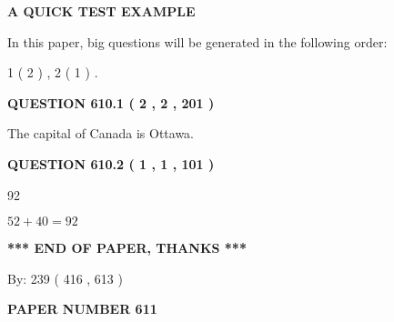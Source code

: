 \documentclass[12pt]{article}
\begin{document}
   
 \vspace{0.2in}
{\LARGE {\textbf{ A QUICK TEST EXAMPLE}}}
   
   
   
\vspace{0.2in}
   
In this paper, big questions will be generated in the following order: 
   
   
   1 ( 2 )
 ,
   2 ( 1 )
 .
  
\vspace{0.2in}
  
{\textbf{\Large{QUESTION
610.1 
 ( 2 , 2 , 201 )
}}}
  
  
 
 
\noindent{}
 
 
The capital of Canada is Ottawa.
 
 
 
 
  
\vspace{0.2in}
  
{\textbf{\Large{QUESTION
610.2 
 ( 1 , 1 , 101 )
}}}
  
  
 
 
\noindent{}

92
 
 
 
 
\noindent{}

$ %
52 +  %
40=   %
92$
 
 
   
   
 \vspace{0.2in}
 
   
   
   
   
\vspace{1.0in} 
{\textbf{\large{ *** END OF PAPER, THANKS *** }}} 
   
   
\hspace{1.0in} By: 
 239 ( 416 ,  613 )
   
   
   
   
\newpage 
\setcounter{page}{ 
   611001 } 
   
   
   
   
 {\textbf{ \Large{ PAPER NUMBER  611  }}}
   
   
\vspace{0.2in}
   
\end{document}
